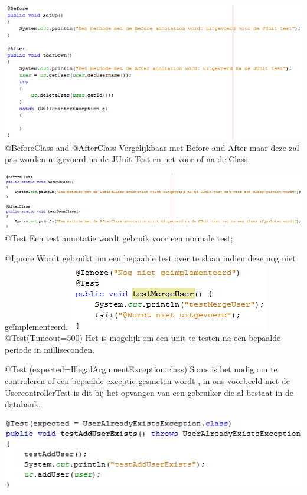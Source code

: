 \documentclass[pdftex,a4paper,12pt,twoside]{report}
\begin{document}
\includegraphics{images/beforeafter.png}\\


@BeforeClass and @AfterClass
Vergelijkbaar met Before and After maar deze zal pas worden utigevoerd na de JUnit Test en net voor of na de Class.

\includegraphics{images/beforeafterclass.png}\\

@Test
Een test annotatie wordt gebruik voor een normale test;

@Ignore
Wordt gebruikt om een bepaalde test over te slaan indien deze nog niet geïmplementeerd.
\includegraphics{images/junit2.png}\\

@Test(Timeout=500)
Het is mogelijk om een unit te testen na een bepaalde periode in milliseconden.

@Test (expected=IllegalArgumentException.class)
Soms is het nodig om te controleren of een bepaalde exceptie gesmeten wordt , in ons voorbeeld met de UsercontrollerTest is dit bij het opvangen van een gebruiker die al bestaat in de databank.

\includegraphics{images/junit3.png}\\
\end{document}
